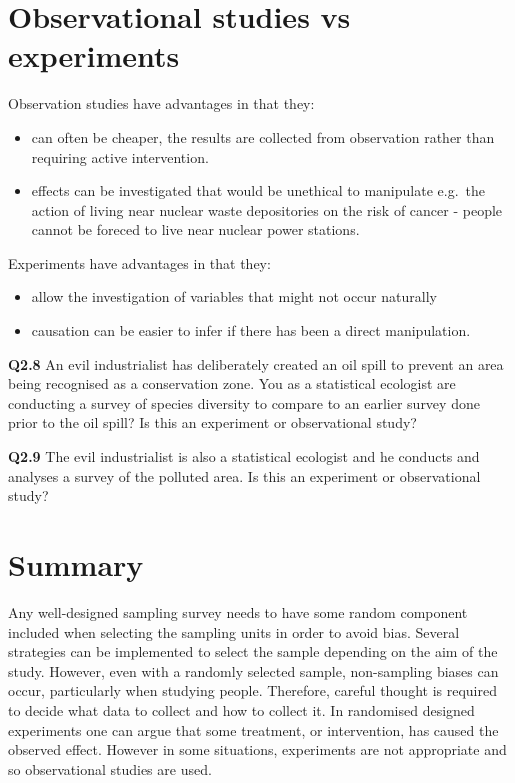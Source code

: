 \documentclass[
  oneside]{krantz}
\providecommand{\tightlist}{%
  \setlength{\itemsep}{0pt}\setlength{\parskip}{0pt}}
\begin{document}
\hypertarget{observational-studies-vs-experiments}{%
\section{Observational studies vs experiments}\label{observational-studies-vs-experiments}}

Observation studies have advantages in that they:

\begin{itemize}
\tightlist
\item
  can often be cheaper, the results are collected from observation rather than requiring active intervention.
\item
  effects can be investigated that would be unethical to manipulate e.g.~the action of living near nuclear waste depositories on the risk of cancer - people cannot be foreced to live near nuclear power stations.
\end{itemize}

Experiments have advantages in that they:

\begin{itemize}
\tightlist
\item
  allow the investigation of variables that might not occur naturally
\item
  causation can be easier to infer if there has been a direct manipulation.
\end{itemize}

\textbf{Q2.8} An evil industrialist has deliberately created an oil spill to prevent an area being recognised as a conservation zone. You as a statistical ecologist are conducting a survey of species diversity to compare to an earlier survey done prior to the oil spill? Is this an experiment or observational study?

\textbf{Q2.9} The evil industrialist is also a statistical ecologist and he conducts and analyses a survey of the polluted area. Is this an experiment or observational study?

\hypertarget{SUMsamp}{%
\section{Summary}\label{SUMsamp}}

Any well-designed sampling survey needs to have some random component included when selecting the sampling units in order to avoid bias. Several strategies can be implemented to select the sample depending on the aim of the study. However, even with a randomly selected sample, non-sampling biases can occur, particularly when studying people. Therefore, careful thought is required to decide what data to collect and how to collect it. In randomised designed experiments one can argue that some treatment, or intervention, has caused the observed effect. However in some situations, experiments are not appropriate and so observational studies are used.
\end{document}

